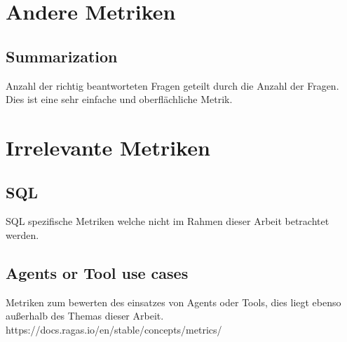 \section{Andere Metriken}
\subsection{Summarization}
Anzahl der richtig beantworteten Fragen geteilt durch die Anzahl der Fragen. Dies ist eine sehr einfache und oberflächliche Metrik.


\section{Irrelevante Metriken}
\subsection{SQL}
SQL spezifische Metriken welche nicht im Rahmen dieser Arbeit betrachtet werden.

\subsection{Agents or Tool use cases}
Metriken zum bewerten des einsatzes von Agents oder Tools, dies liegt ebenso außerhalb des Themas dieser Arbeit.
https://docs.ragas.io/en/stable/concepts/metrics/